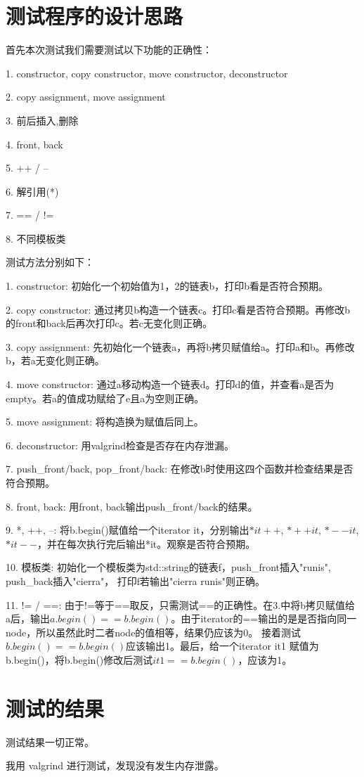 \documentclass[UTF8]{ctexart}
\begin{document}
\pagestyle{fancy}
\fancyhead{}

\section{测试程序的设计思路}

首先本次测试我们需要测试以下功能的正确性：

1. constructor, copy constructor, move constructor, deconstructor

2. copy assignment, move assignment

3. 前后插入,删除

4. front, back

5. ++ / --

6. 解引用(*)

7. == / !=

8. 不同模板类

\vspace{\baselineskip}


测试方法分别如下：

1. constructor: 初始化一个初始值为1，2的链表b，打印b看是否符合预期。

2. copy constructor: 通过拷贝b构造一个链表c。打印c看是否符合预期。再修改b的front和back后再次打印c。若c无变化则正确。

3. copy assignment: 先初始化一个链表a，再将b拷贝赋值给a。打印a和b。再修改b，若a无变化则正确。

4. move constructor: 通过a移动构造一个链表d。打印d的值，并查看a是否为empty。若a的值成功赋给了e且a为空则正确。

5. move assignment: 将构造换为赋值后同上。

6. deconstructor: 用valgrind检查是否存在内存泄漏。

7. push\_front/back, pop\_front/back: 在修改b时使用这四个函数并检查结果是否符合预期。

8. front, back: 用front, back输出push\_front/back的结果。

9. *, ++, --: 将b.begin()赋值给一个iterator it，分别输出$*it++$, $*++it$, $*--it$, $*it--$，并在每次执行完后输出*it。观察是否符合预期。

10. 模板类: 初始化一个模板类为std::string的链表f，push\_front插入"runis", push\_back插入"cierra"， 打印f若输出"cierra runis"则正确。

11. != / ==: 由于!=等于==取反，只需测试==的正确性。在3.中将b拷贝赋值给a后，输出$a.begin() == b.begin()$。由于iterator的==输出的是是否指向同一node，所以虽然此时二者node的值相等，结果仍应该为0。
   接着测试$b.begin() == b.begin()$应该输出1。最后，给一个iterator it1 赋值为b.begin()，将b.begin()修改后测试$it1 == b.begin()$，应该为1。

\section{测试的结果}

   测试结果一切正常。
   
   我用 valgrind 进行测试，发现没有发生内存泄露。
\end{document}
